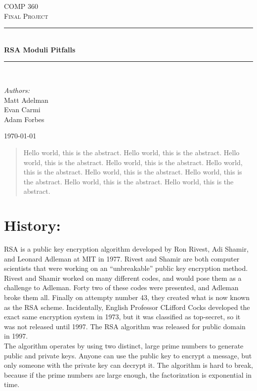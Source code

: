 \documentclass[12pt]{article}
\newcommand{\HRule}{\rule{\linewidth}{0.5mm}}
\begin{document}
\begin{titlepage}

\begin{center}
\textsc{\LARGE COMP 360}\\[1.5cm]
\textsc{\Large Final Project}\\[0.5cm]
\HRule \\[0.4cm]
{ \huge \bfseries RSA Moduli Pitfalls}\\[0.4cm]
\HRule \\[1.5cm]
\begin{minipage}{0.4\textwidth}
\begin{center} \large
\emph{Authors:}\\
Matt Adelman\\Evan Carmi\\Adam Forbes
\end{center}
\end{minipage}
\vfill
{\large \today}
\end{center}
\end{titlepage}

\tableofcontents

\newpage

\begin{@twocolumnfalse}

\begin{abstract}
  Hello world, this is the abstract.  Hello world, this is the abstract.
  Hello world, this is the abstract.  Hello world, this is the abstract.  Hello world, this is the abstract.  Hello world, this is the abstract.  Hello world, this is the abstract.  Hello world, this is the abstract.  Hello world, this is the abstract.
\end{abstract}
\end{@twocolumnfalse}


\section{History:}
\indent\indent
RSA is a public key encryption algorithm developed by Ron Rivest, Adi Shamir, 
and Leonard Adleman at MIT in 1977. Rivest and Shamir are both computer
scientists that were working on an ``unbreakable'' public key encryption method.
Rivest and Shamir worked on many different codes, and would pose them as a
challenge to Adleman. Forty two of these codes were presented, and Adleman broke
them all. Finally on attempty number 43, they created what is now known as the
RSA scheme. Incidentally, English Professor CLifford Cocks developed the exact
same encryption system in 1973, but it was classified as top-secret, so it was
not released until 1997. The RSA algorithm was released for public domain in
1997.\\\indent
The algorithm operates by using two distinct, large prime numbers to generate
public and private keys. Anyone can use the public key to encrypt a message, but
only someone with the private key can decrypt it. The algorithm is hard to
break, because if the prime numbers are large enough, the factorization is
exponential in time.
\end{document}
